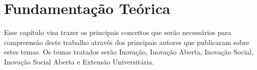 \chapter{Fundamentação Teórica}
\label{chap:fundamentacao}

Esse capítulo visa trazer os principais conceitos que serão necessários para compreensão deste trabalho através dos principais autores que publicaram sobre estes temas. Os temas tratados serão Inovação, Inovação Aberta, Inovação Social, Inovação Social Aberta e Extensão Universitária.







